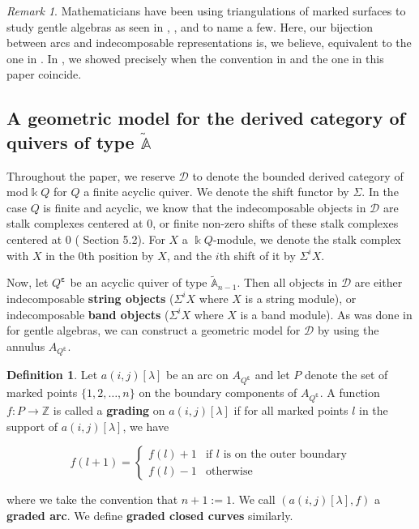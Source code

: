 \documentclass[12pt]{amsart}
\theoremstyle{plain}
\theoremstyle{definition}
\newtheorem{defn}{Definition}[section]
\theoremstyle{remark}
\newtheorem{rem}{Remark}[section]
\begin{document}
\begin{rem}
{%
Mathematicians have been using triangulations of marked surfaces to study {\color{black} gentle} algebras as seen in \cite{clustersareinbijectionwithtriangulations}, \cite{Master'sThesisClustersandTriangulations}, and \cite{baur2021geometric} to name a few. Here, our bijection between arcs and indecomposable representations is, {\color{black} we believe}, equivalent to the one in \cite{baur2021geometric}. In \cite{igusa2024clusters}, we showed precisely when the convention in \cite{Master'sThesisClustersandTriangulations} and the one in this paper coincide. }
\end{rem}

\subsection{A geometric model for the derived category of quivers of type $\tilde{\mathbb{A}}$}

Throughout the paper, we reserve $\mathscr{D}$ to denote the bounded derived category of mod$\Bbbk Q$ for $Q$ a finite acyclic quiver. We denote the shift functor by $\Sigma$. In the case $Q$ is finite and acyclic, we know that the indecomposable objects in $\mathscr{D}$ are stalk complexes centered at 0, or finite non-zero shifts of these stalk complexes centered at 0 {(\cite{schofield1990triangulated} Section 5.2)}. For $X$ a $\Bbbk Q$-module, we denote the stalk complex with $X$ in the 0th position by $X$, and the $i$th shift of it by $\Sigma^i X$. 

Now, let $Q^{\bm{\varepsilon}}$ be an acyclic quiver of type $\tilde{\mathbb{A}}_{n-1}$. Then all objects in $\mathscr{D}$ are either indecomposable \textbf{string objects} ($\Sigma^i X$ where $X$ is a string module), or indecomposable \textbf{band objects} ($\Sigma^i X$ where $X$ is a band module).  As was done in \cite{opper2018geometric} for gentle algebras, we can construct a geometric model for $\mathscr{D}$ by using the annulus $A_{Q^{\bm{\varepsilon}}}$. 

\begin{defn}
    Let $a(i,j)[\lambda]$ be an arc on $A_{Q^{\bm{\varepsilon}}}$ and let $P$ denote the set of marked points $\{1,2,\dots,n\}$ on the boundary components of $A_{Q^{\bm{\varepsilon}}}$. A function $f:P\rightarrow \mathbb{Z}$ is called a \textbf{grading} on $a(i,j)[\lambda]$ if for all {marked points} $l$ in the support of $a(i,j)[\lambda]$, we have

    \[ f(l+1) = \begin{cases} 
          f(l) + 1 & \text{if $l$ is on the outer boundary} \\
          f(l) - 1 & \text{otherwise}
       \end{cases}
    \]

    where we take the convention that $n+1 := 1$. We call $(a(i,j)[\lambda],f)$ a \textbf{graded arc}. We define \textbf{graded closed curves} {\color{black} similarly}.
\end{defn}
\end{document}

